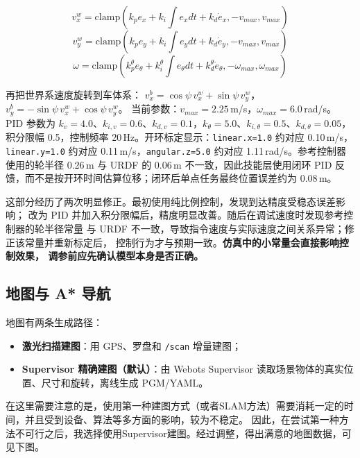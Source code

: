 \documentclass[10pt,twocolumn]{ctexart}
\begin{document}
\begin{equation}
  v_x^{w} = \mathrm{clamp}(k_p e_x + k_i \!\!\int\! e_x dt + k_d \dot{e}_x, -v_{max}, v_{max})
\end{equation}
\begin{equation}
  v_y^{w} = \mathrm{clamp}(k_p e_y + k_i \!\!\int\! e_y dt + k_d \dot{e}_y, -v_{max}, v_{max})
\end{equation}
\begin{equation}
  \omega = \mathrm{clamp}(k_p^\theta e_\theta + k_i^\theta \!\!\int\! e_\theta dt + k_d^\theta \dot{e}_\theta, -\omega_{max}, \omega_{max})
\end{equation}

再把世界系速度旋转到车体系：
$v_x^b = \cos\psi\,v_x^w + \sin\psi\,v_y^w$，
$v_y^b = -\sin\psi\,v_x^w + \cos\psi\,v_y^w$。
当前参数：$v_{max}=2.25$\,m/s，$\omega_{max}=6.0$\,rad/s。
PID 参数为 $k_v=4.0$、$k_{i,v}=0.6$、$k_{d,v}=0.1$，$k_\theta=5.0$、$k_{i,\theta}=0.5$、$k_{d,\theta}=0.05$，积分限幅 0.5，控制频率 20\,Hz。开环标定显示：\texttt{linear.x=1.0} 约对应 0.10\,m/s，\texttt{linear.y=1.0} 约对应 0.11\,m/s，\texttt{angular.z=5.0} 约对应 1.11\,rad/s。参考控制器使用的轮半径 0.26\,m 与 URDF 的 0.06\,m 不一致，因此技能层使用闭环 PID 反馈，而不是按开环时间估算位移；闭环后单点任务最终位置误差约为 0.08\,m。

这部分经历了两次明显修正。最初使用纯比例控制，发现到达精度受稳态误差影响；
改为 PID 并加入积分限幅后，精度明显改善。随后在调试速度时发现参考控制器的轮半径常量
与 URDF 不一致，导致指令速度与实际速度之间关系异常；修正该常量并重新标定后，
控制行为才与预期一致。\textbf{仿真中的小常量会直接影响控制效果，
调参前应先确认模型本身是否正确。}

\subsection{地图与 A* 导航}
地图有两条生成路径：
\begin{itemize}
  \item \textbf{激光扫描建图}：用 GPS、罗盘和 \texttt{/scan} 增量建图；
  \item \textbf{Supervisor 精确建图（默认）}：由 Webots Supervisor 读取场景物体的真实位置、尺寸和旋转，离线生成 PGM/YAML。
\end{itemize}
在这里需要注意的是，使用第一种建图方式（或者SLAM方法）需要消耗一定的时间，并且受到设备、算法等多方面的影响，较为不稳定。
因此，在尝试第一种方法不可行之后，我选择使用Supervisor建图。经过调整，得出满意的地图数据，可见下图。\newline
\end{document}
